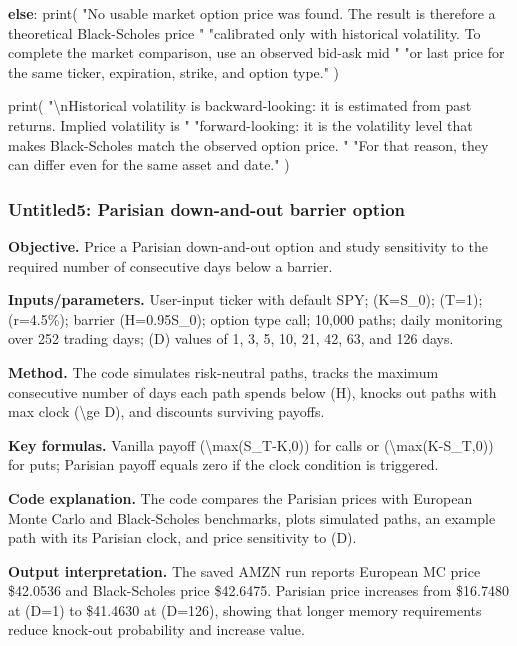 \documentclass[
  11pt,
]{article}
\newenvironment{Shaded}{}{}
\newcommand{\BuiltInTok}[1]{\textcolor[rgb]{0.00,0.50,0.00}{#1}}
\newcommand{\CharTok}[1]{\textcolor[rgb]{0.25,0.44,0.63}{#1}}
\newcommand{\ControlFlowTok}[1]{\textcolor[rgb]{0.00,0.44,0.13}{\textbf{#1}}}
\newcommand{\NormalTok}[1]{#1}
\newcommand{\StringTok}[1]{\textcolor[rgb]{0.25,0.44,0.63}{#1}}
\begin{document}
\begin{Shaded}
\begin{Highlighting}[]
\ControlFlowTok{else}\NormalTok{:}
    \BuiltInTok{print}\NormalTok{(}
        \StringTok{"No usable market option price was found. The result is therefore a theoretical Black{-}Scholes price "}
        \StringTok{"calibrated only with historical volatility. To complete the market comparison, use an observed bid{-}ask mid "}
        \StringTok{"or last price for the same ticker, expiration, strike, and option type."}
\NormalTok{    )}

\BuiltInTok{print}\NormalTok{(}
    \StringTok{"}\CharTok{\textbackslash{}n}\StringTok{Historical volatility is backward{-}looking: it is estimated from past returns. Implied volatility is "}
    \StringTok{"forward{-}looking: it is the volatility level that makes Black{-}Scholes match the observed option price. "}
    \StringTok{"For that reason, they can differ even for the same asset and date."}
\NormalTok{)}
\end{Highlighting}
\end{Shaded}

\subsubsection{Untitled5: Parisian down-and-out barrier option}\label{untitled5-parisian-down-and-out-barrier-option}

\textbf{Objective.} Price a Parisian down-and-out option and study sensitivity to the required number of consecutive days below a barrier.

\textbf{Inputs/parameters.} User-input ticker with default SPY; (K=S\_0); (T=1); (r=4.5\%); barrier (H=0.95S\_0); option type call; 10,000 paths; daily monitoring over 252 trading days; (D) values of 1, 3, 5, 10, 21, 42, 63, and 126 days.

\textbf{Method.} The code simulates risk-neutral paths, tracks the maximum consecutive number of days each path spends below (H), knocks out paths with max clock (\textbackslash ge D), and discounts surviving payoffs.

\textbf{Key formulas.} Vanilla payoff (\textbackslash max(S\_T-K,0)) for calls or (\textbackslash max(K-S\_T,0)) for puts; Parisian payoff equals zero if the clock condition is triggered.

\textbf{Code explanation.} The code compares the Parisian prices with European Monte Carlo and Black-Scholes benchmarks, plots simulated paths, an example path with its Parisian clock, and price sensitivity to (D).

\textbf{Output interpretation.} The saved AMZN run reports European MC price \$42.0536 and Black-Scholes price \$42.6475. Parisian price increases from \$16.7480 at (D=1) to \$41.4630 at (D=126), showing that longer memory requirements reduce knock-out probability and increase value.
\end{document}
